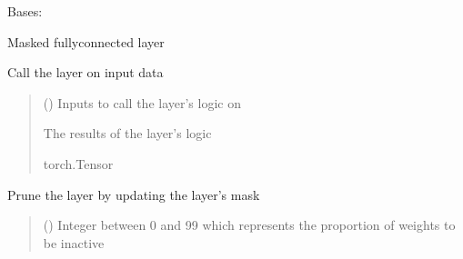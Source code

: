 \documentclass[letterpaper,10pt,english]{sphinxmanual}
\begin{document}
\begin{fulllineitems}
\label{\detokenize{beyondml.pt.layers:beyondml.pt.layers.MaskedDense.MaskedDense}}
\pysigstartsignatures
{}
\pysigstopsignatures
\sphinxAtStartPar
Bases: 

\sphinxAtStartPar
Masked fully\sphinxhyphen{}connected layer

\begin{fulllineitems}
\label{\detokenize{beyondml.pt.layers:beyondml.pt.layers.MaskedDense.MaskedDense.forward}}
\pysigstartsignatures
{}
\pysigstopsignatures
\sphinxAtStartPar
Call the layer on input data
\begin{quote}\begin{description}
\sphinxAtStartPar
{} () \textendash{} Inputs to call the layer’s logic on

\sphinxAtStartPar
{} \textendash{} The results of the layer’s logic

\sphinxAtStartPar
torch.Tensor

\end{description}\end{quote}

\end{fulllineitems}


\begin{fulllineitems}
\label{\detokenize{beyondml.pt.layers:beyondml.pt.layers.MaskedDense.MaskedDense.prune}}
\pysigstartsignatures
{}
\pysigstopsignatures
\sphinxAtStartPar
Prune the layer by updating the layer’s mask
\begin{quote}\begin{description}
\sphinxAtStartPar
{} () \textendash{} Integer between 0 and 99 which represents the proportion of weights to be inactive


\end{description}
\end{quote}
\end{fulllineitems}
\end{fulllineitems}
\end{document}
